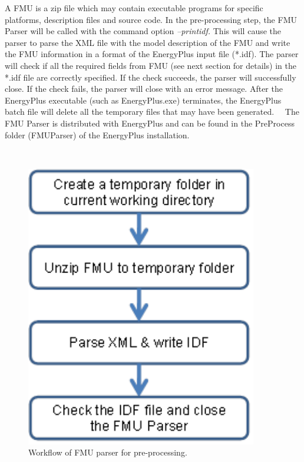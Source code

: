 A FMU is a zip file which may contain executable programs for specific platforms, description files and source code. In the pre-processing step, the FMU Parser will be called with the command option \emph{--printidf.} This will cause the parser to parse the XML file with the model description of the FMU and write the FMU information in a format of the EnergyPlus input file (*.idf). The parser will check if all the required fields from FMU (see next section for details) in the *.idf file are correctly specified. If the check succeeds, the parser will successfully close. If the check fails, the parser will close with an error message. After the EnergyPlus executable (such as EnergyPlus.exe) terminates, the EnergyPlus batch file will delete all the temporary files that may have been generated.~~ The FMU Parser is distributed with EnergyPlus and can be found in the PreProcess folder (FMUParser) of the EnergyPlus installation.

\textbf{~}

\begin{figure}[hbtp] %
\centering
\includegraphics[width=0.9\textwidth, height=0.9\textheight, keepaspectratio=true]{media/image037.png}
\caption{Workflow of FMU parser for pre-processing. \protect \label{fig:workflow-of-fmu-parser-for-pre-processing.}}
\end{figure}

